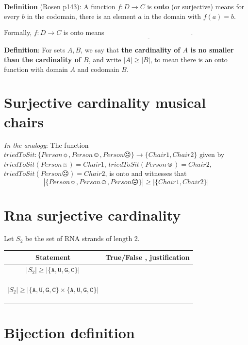 \documentclass[12pt, oneside]{article}
\newcommand{\A}[0]{\texttt{A}}
\newcommand{\C}[0]{\texttt{C}}
\newcommand{\G}[0]{\texttt{G}}
\newcommand{\U}[0]{\texttt{U}}
\begin{document}
{\bf Definition}  (Rosen p143): A function $f: D  \to C$ is {\bf onto} (or  surjective) means for every $b$ in the codomain, 
there  is an element $a$ in the domain with  $f(a) = b$.


Formally, $f: D  \to  C$ is  onto  means $\underline{\phantom{\forall b \in C  \exists a \in D ( f(a) = b)}}$.


{\bf Definition}:  For sets $A, B$, we say that  {\bf the  cardinality of $A$ is  no  smaller than the cardinality of  $B$}, and 
write $|A| \geq |B|$, to mean there is an onto function  with domain $A$  and codomain $B$.
 \vfill
\section*{Surjective cardinality musical chairs}


{\it In the analogy}: The function $triedToSit: \{ Person\sun, Person\smiley, Person\frownie \} \to  \{ Chair1, Chair2\} $ given
by $triedToSit(Person\sun) = Chair1$,  $triedToSit(Person\smiley) = Chair2$, 
$triedToSit(Person\frownie) = Chair2$, is onto and witnesses that 
\[
 |\{ Person\sun, Person\smiley, Person\frownie \}| \geq | \{ Chair1, Chair2\} |
\] \vfill
\section*{Rna surjective cardinality}


Let $S_2$ be the set of RNA strands of length 2.

\vspace{-20pt}

\begin{center}
\begin{tabular}{|c|p{5in}|}
\hline
Statement  &  True/False , justification \\
\hline
$ |S_2 | \geq | \{\A,\U,\G,\C\} |$ &  \\
&\\&\\&\\
\hline
$ |S_2 | \geq | \{\A,\U,\G,\C\} \times \{\A, \U, \G,\C\} |$ &  \\
&\\&\\&\\
\hline
\end{tabular}
\end{center} \vfill
\section*{Bijection definition}
\end{document}
